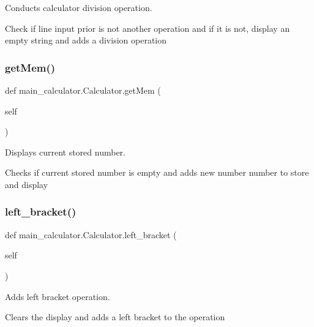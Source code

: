 Conducts calculator division operation. 

Check if line input prior is not another operation and if it is not, display an empty string and adds a division operation \mbox{\label{classmain__calculator_1_1_calculator_affb70322f0ae2566a352414980fc4c76}} 
\subsubsection{\texorpdfstring{get\+Mem()}{getMem()}}
{\footnotesize\ttfamily def main\+\_\+calculator.\+Calculator.\+get\+Mem (\begin{DoxyParamCaption}\item[{}]{self }\end{DoxyParamCaption})}



Displays current stored number. 

Checks if current stored number is empty and adds new number number to store and display \mbox{\label{classmain__calculator_1_1_calculator_ac64294792ca603503761632e96f811b7}} 
\subsubsection{\texorpdfstring{left\+\_\+bracket()}{left\_bracket()}}
{\footnotesize\ttfamily def main\+\_\+calculator.\+Calculator.\+left\+\_\+bracket (\begin{DoxyParamCaption}\item[{}]{self }\end{DoxyParamCaption})}



Adds left bracket operation. 

Clears the display and adds a left bracket to the operation \mbox{\label{classmain__calculator_1_1_calculator_a1358fbc08c2e9c60cb50f15c28649ffe}} 

